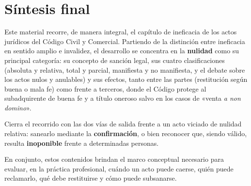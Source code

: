 \documentclass[12pt,oneside]{book}
\begin{document}
\chapter*{Síntesis final}

Este material recorre, de manera integral, el capítulo de ineficacia de los actos jurídicos del Código Civil y Comercial. Partiendo de la distinción entre ineficacia en sentido amplio e invalidez, el desarrollo se concentra en la \textbf{nulidad} como su principal categoría: su concepto de sanción legal, sus cuatro clasificaciones (absoluta y relativa, total y parcial, manifiesta y no manifiesta, y el debate sobre los actos nulos y anulables) y sus efectos, tanto entre las partes (restitución según buena o mala fe) como frente a terceros, donde el Código protege al subadquirente de buena fe y a título oneroso salvo en los casos de «venta \textit{a non domino}».

Cierra el recorrido con las dos vías de salida frente a un acto viciado de nulidad relativa: sanearlo mediante la \textbf{confirmación}, o bien reconocer que, siendo válido, resulta \textbf{inoponible} frente a determinadas personas.

En conjunto, estos contenidos brindan el marco conceptual necesario para evaluar, en la práctica profesional, cuándo un acto puede caerse, quién puede reclamarlo, qué debe restituirse y cómo puede subsanarse.
\end{document}
